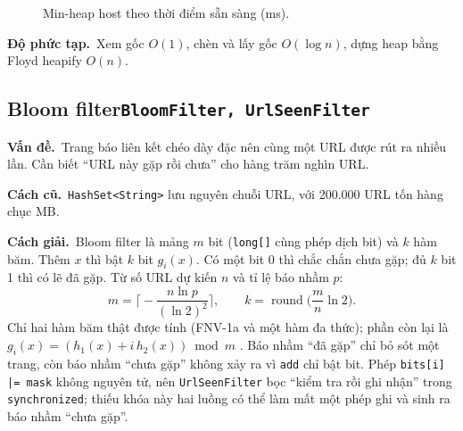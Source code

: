 \documentclass[9pt,twocolumn,a4paper]{extarticle}
\newcommand{\code}[1]{\texttt{#1}}
\newcommand{\dsa}[2]{\subsection[#1]{#1\hfill{\normalfont\footnotesize\code{#2}}}}
\newcommand{\vande}{\textcolor{linkblue}{\textbf{Vấn đề.}}~}
\newcommand{\cachgiai}{\textcolor{linkblue}{\textbf{Cách giải.}}~}
\newcommand{\dpt}{\textcolor{linkblue}{\textbf{Độ phức tạp.}}~}
\newcommand{\cu}{\textcolor{linkblue}{\textbf{Cách cũ.}}~}
\begin{document}
\begin{figure}[H]
\centering
{}
\caption{Min-heap host theo thời điểm sẵn sàng (ms).}
\label{fig:heap}
\end{figure}

\dpt Xem gốc $O(1)$, chèn và lấy gốc $O(\log n)$, dựng heap bằng Floyd heapify $O(n)$.

\dsa{Bloom filter}{BloomFilter, UrlSeenFilter}
\vande Trang báo liên kết chéo dày đặc nên cùng một URL được rút ra nhiều lần. Cần biết ``URL này gặp rồi chưa'' cho hàng trăm nghìn URL.

\cu \code{HashSet<String>} lưu nguyên chuỗi URL, với 200.000 URL tốn hàng chục MB.

\cachgiai Bloom filter \cite{bloom1970} là mảng $m$ bit (\code{long[]} cùng phép dịch bit) và $k$ hàm băm. Thêm $x$ thì bật $k$ bit $g_i(x)$. Có một bit 0 thì chắc chắn chưa gặp; đủ $k$ bit 1 thì có lẽ đã gặp. Từ số URL dự kiến $n$ và tỉ lệ báo nhầm $p$:
\begin{equation}
m=\Big\lceil-\frac{n\ln p}{(\ln 2)^2}\Big\rceil,\qquad k=\operatorname{round}\Big(\frac{m}{n}\ln 2\Big).
\label{eq:bloom}
\end{equation}
Chỉ hai hàm băm thật được tính (FNV-1a và một hàm đa thức); phần còn lại là $g_i(x)=(h_1(x)+i\,h_2(x))\bmod m$ \cite{kirsch2006}. Báo nhầm ``đã gặp'' chỉ bỏ sót một trang, còn báo nhầm ``chưa gặp'' không xảy ra vì \code{add} chỉ bật bit. Phép \code{bits[i] |= mask} không nguyên tử, nên \code{UrlSeenFilter} bọc ``kiểm tra rồi ghi nhận'' trong \code{synchronized}; thiếu khóa này hai luồng có thể làm mất một phép ghi và sinh ra báo nhầm ``chưa gặp''.
\end{document}
